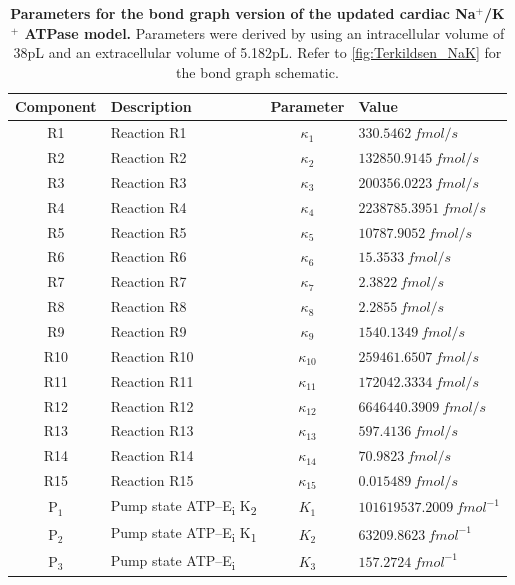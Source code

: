 \documentclass[fleqn,10pt]{physiome}
\begin{document}
\begin{table}[H]
	\caption{\textbf{Parameters for the bond graph version of the updated cardiac Na$^+$/K$^+$ ATPase model.} Parameters were derived by using an intracellular volume of 38pL and an extracellular volume of 5.182pL. Refer to \autoref{fig:Terkildsen_NaK} for the bond graph schematic.}
	\centering
	\begin{tabular}{cl c l}
		\toprule
		\textbf{Component} & \textbf{Description}& \textbf{Parameter} & \textbf{Value} \\ \midrule
		R1 & Reaction R1 & $\kappa_1$ & $ 330.5462\ \si{fmol/s} $\\ 
		R2 & Reaction R2 & $\kappa_2$ & $ 132850.9145\ \si{fmol/s} $\\ 
		R3 & Reaction R3 & $\kappa_3$ & $ 200356.0223\ \si{fmol/s} $\\ 
		R4 & Reaction R4 & $\kappa_4$ & $ 2238785.3951\ \si{fmol/s} $\\ 
		R5 & Reaction R5 & $\kappa_5$ & $ 10787.9052\ \si{fmol/s} $\\ 
		R6 & Reaction R6 & $\kappa_6$ & $ 15.3533\ \si{fmol/s} $\\ 
		R7 & Reaction R7 & $\kappa_7$ & $ 2.3822\ \si{fmol/s} $\\ 
		R8 & Reaction R8 & $\kappa_8$ & $ 2.2855\ \si{fmol/s} $\\ 
		R9 & Reaction R9 & $\kappa_9$ & $ 1540.1349\ \si{fmol/s} $\\ 
		R10 & Reaction R10 & $\kappa_{10}$ & $ 259461.6507\ \si{fmol/s} $\\ 
		R11 & Reaction R11 & $\kappa_{11}$ & $ 172042.3334\ \si{fmol/s} $\\ 
		R12 & Reaction R12 & $\kappa_{12}$ & $ 6646440.3909\ \si{fmol/s} $\\ 
		R13 & Reaction R13 & $\kappa_{13}$ & $ 597.4136\ \si{fmol/s} $\\ 
		R14 & Reaction R14 & $\kappa_{14}$ & $ 70.9823\ \si{fmol/s} $\\ 
		R15 & Reaction R15 & $\kappa_{15}$ & $ 0.015489\ \si{fmol/s} $\\ 
		$\text{P}_1$ & Pump state ATP--E\textsubscript{i} K\textsubscript{2}
		 & $K_1$ & $101619537.2009\ \si{fmol^{-1}}$ \\ 
		$\text{P}_2$ & Pump state ATP--E\textsubscript{i} K\textsubscript{1}
		 & $K_2$ & $63209.8623\ \si{fmol^{-1}}$ \\ 
		$\text{P}_3$ & Pump state ATP--E\textsubscript{i}
		 & $K_3$ & $157.2724\ \si{fmol^{-1}}$ \\ 

\end{tabular}
\end{table}
\end{document}
